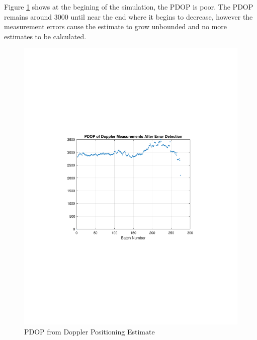 \documentclass[12pt]{report}
\begin{document}
Figure \ref{fig:USRPDoppler15minIridPDOP} shows at the begining of the simulation, the PDOP is poor. The PDOP remains around 3000 until near the end where it begins to decrease, however the measurement errors cause the estimate to grow unbounded and no more estimates to be calculated. 
\begin{figure}[h!]
    \centering
    \includegraphics[trim=1.2in 3.3in 1.75in 3.3in,clip,width=5in]
    {Irid_15min_USRP_DopplerPDOP.pdf}
    \caption{PDOP from Doppler Positioning Estimate}
    \label{fig:USRPDoppler15minIridPDOP}
\end{figure}

\pagebreak
\end{document}
